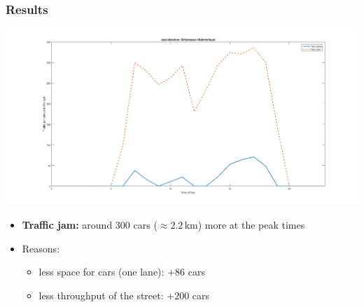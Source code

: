 \documentclass[9pt]{beamer}
\begin{document}
\begin{frame}
\frametitle{Results}

\includegraphics[width=1.\columnwidth]{Comparison_Traffic_jam.png}
\begin{itemize}
\item \textbf{Traffic jam:} around 300 cars ($\approx 2.2\,\mathrm{km}$) more at the peak times
\item Reasons:
\begin{itemize}
\item less space for cars (one lane): $+86$ cars
\item less throughput of the street: $+200$ cars
\end{itemize}
\end{itemize}
\end{frame}
\end{document}
